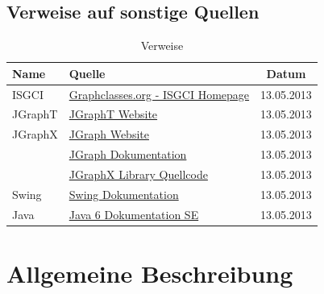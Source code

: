 \documentclass[11pt,a4paper]{article}
\begin{document}
  	\subsection{Verweise auf sonstige Quellen} %
  	{
          
          \begin{table}[h]
          	\caption{Verweise}
          	\label{fig:figurename}
          	\begin{center}
          		\begin{tabular}{|l|p{10cm}|c|}
          		\hline
          
          		\hline
          		\textbf{Name} & \textbf{Quelle} & \textbf{Datum} \\
          		\hline
          			 ISGCI & \href{http://www.graphclasses.org/}{Graphclasses.org - ISGCI Homepage} & 13.05.2013\\ \hline
          			 JGraphT & \href{http://jgrapht.org/}{JGraphT Website} & 13.05.2013 \\ \hline
          			 JGraphX & \href{http://www.jgraph.com/}{JGraph Website} & 13.05.2013 \\  \hline
          			  & \href{http://jgraph.github.io/mxgraph/java/docs/index.html}{JGraph Dokumentation} & 13.05.2013 \\  \hline
          			  & \href{https://github.com/jgraph/jgraphx}{JGraphX Library Quellcode} & 13.05.2013\\  \hline
					Swing & \href{http://docs.oracle.com/javase/1.4.2/docs/api/javax/swing/package-summary.html}{Swing Dokumentation} & 13.05.2013 \\  \hline
					Java & \href{http://docs.oracle.com/javase/6/docs/api/}{Java 6 Dokumentation SE} & 13.05.2013 \\  \hline
          		\end{tabular}
          	\end{center}
          \end{table}
          }
    
  	
\newpage
\section{Allgemeine Beschreibung} %
\end{document}
